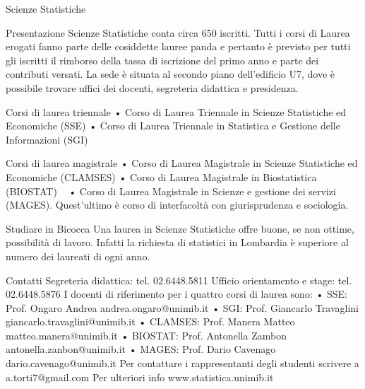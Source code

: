 Scienze Statistiche

Presentazione
Scienze Statistiche conta circa 650 iscritti. Tutti i corsi di Laurea erogati fanno parte delle cosiddette lauree panda e pertanto è previsto per tutti gli iscritti il rimborso della tassa di iscrizione del primo anno e parte dei contributi versati. 
La sede è situata al secondo piano dell'edificio U7, dove è possibile trovare uffici dei docenti, segreteria didattica e presidenza. 

Corsi di laurea triennale 
    • Corso di Laurea Triennale in Scienze Statistiche ed Economiche (SSE) 
    • Corso di Laurea Triennale in Statistica e Gestione delle Informazioni (SGI) 

Corsi di laurea magistrale
    • Corso di Laurea Magistrale in Scienze Statistiche ed Economiche (CLAMSES) 
    • Corso di Laurea Magistrale in Biostatistica (BIOSTAT) 
    • Corso di Laurea Magistrale in Scienze e gestione dei servizi (MAGES). Quest'ultimo è corso di interfacoltà con giurisprudenza e sociologia.

Studiare in Bicocca
Una laurea in Scienze Statistiche offre buone, se non ottime, possibilità di lavoro. Infatti la richiesta di statistici in Lombardia è superiore al numero dei laureati di ogni anno. 

Contatti
Segreteria didattica: tel. 02.6448.5811 
Ufficio orientamento e stage: tel. 02.6448.5876
I docenti di riferimento per i quattro corsi di laurea sono: 
       • SSE: Prof. Ongaro Andrea andrea.ongaro@unimib.it 
       • SGI: Prof. Giancarlo Travaglini giancarlo.travaglini@unimib.it 
       • CLAMSES: Prof. Manera Matteo matteo.manera@unimib.it 
       • BIOSTAT: Prof. Antonella Zambon antonella.zanbon@unimib.it 
       • MAGES: Prof. Dario Cavenago dario.cavenago@unimib.it
Per contattare i rappresentanti degli studenti scrivere a a.torti7@gmail.com
Per ulteriori info www.statistica.unimib.it 
